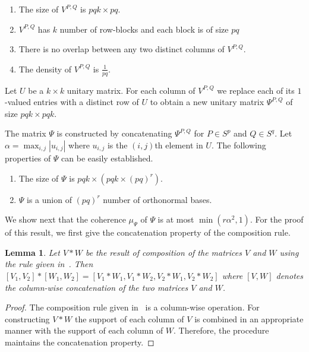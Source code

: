 \documentclass{IEEEtran}
\newtheorem{lemma}[theorem]{Lemma}
\begin{document}
\begin{enumerate}
\item The size of $V^{P,Q}$ is $pqk \times pq.$  
\item $V^{P,Q}$ has $k$ number of row-blocks and each block is of size $pq$
\item There is no overlap between any two distinct columns of $V^{P,Q}.$
\item The density of $V^{P,Q}$ is $\frac{1}{pq}.$
\end{enumerate}

Let $U$ be a $k \times k$ unitary matrix. For each column of $V^{P,Q}$ we replace each
of its $1$-valued entries with a distinct row of $U$ to obtain
a new unitary matrix $\Psi^{P,Q}$ of size $pqk \times pqk$.

The matrix $\Psi$ is constructed by concatenating
$\Psi^{P,Q}$ for $P\in S^{p}$ and
$Q\in S^{q}.$ Let $\alpha = \max_{i,j} |u_{i,j}|$ where
$u_{i,j}$ is the $(i,j)$th element in $U$. The following
properties of $\Psi$ can be easily established.
\begin{enumerate}
\item The size of  $\Psi$ is $pqk \times (pqk \times(pq)^{r}).$ 
\item $\Psi$ is a union of $(pq)^{r}$ number of orthonormal bases. 
\end{enumerate}

We show next that the coherence $\mu_{\Psi}$ of $\Psi$ is at most
$\min(r\alpha^{2},1)$. For the proof of this result, we first give
the concatenation property of the composition rule.
\begin{lemma}
  \label{lem:concat}
  Let $V\ast W$ be the result of composition of the matrices $V$ and $W$
  using the rule given in~\cite{pra_2016}.
  Then $[V_1,V_2]\ast [W_1,W_2] = [V_1\ast W_1,V_1\ast W_2,V_2\ast W_1,
 V_2\ast W_2]$ where $[V,W]$ denotes the column-wise
  concatenation of the two matrices $V$ and $W$.
\end{lemma}
\begin{proof}
  The composition rule given in~\cite{pra_2016} is a column-wise operation.
  For constructing $V\ast W$ the support of each column of
  $V$ is combined in an appropriate manner with the support of each column of
  $W$. Therefore, the procedure maintains the concatenation property.
\end{proof}
\end{document}
